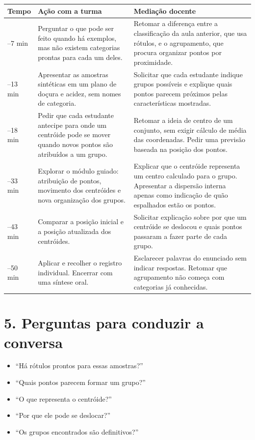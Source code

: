 \documentclass[12pt,a4paper]{article}
\begin{document}
\renewcommand{\arraystretch}{1.22}
\begin{tabularx}{\linewidth}{|>{\centering\arraybackslash}p{1.65cm}|p{5.0cm}|X|}
\hline
\textbf{Tempo} & \textbf{Ação com a turma} & \textbf{Mediação docente} \\
\hline
0--7 min & Perguntar o que pode ser feito quando há exemplos, mas não existem categorias prontas para cada um deles. & Retomar a diferença entre a classificação da aula anterior, que usa rótulos, e o agrupamento, que procura organizar pontos por proximidade. \\
\hline
7--13 min & Apresentar as amostras sintéticas em um plano de doçura e acidez, sem nomes de categoria. & Solicitar que cada estudante indique grupos possíveis e explique quais pontos parecem próximos pelas características mostradas. \\
\hline
13--18 min & Pedir que cada estudante antecipe para onde um centróide pode se mover quando novos pontos são atribuídos a um grupo. & Retomar a ideia de centro de um conjunto, sem exigir cálculo de média das coordenadas. Pedir uma previsão baseada na posição dos pontos. \\
\hline
18--33 min & Explorar o módulo guiado: atribuição de pontos, movimento dos centróides e nova organização dos grupos. & Explicar que o centróide representa um centro calculado para o grupo. Apresentar a dispersão interna apenas como indicação de quão espalhados estão os pontos. \\
\hline
33--43 min & Comparar a posição inicial e a posição atualizada dos centróides. & Solicitar explicação sobre por que um centróide se deslocou e quais pontos passaram a fazer parte de cada grupo. \\
\hline
43--50 min & Aplicar e recolher o registro individual. Encerrar com uma síntese oral. & Esclarecer palavras do enunciado sem indicar respostas. Retomar que agrupamento não começa com categorias já conhecidas. \\
\hline
\end{tabularx}

\section*{5. Perguntas para conduzir a conversa}

\begin{itemize}
  \item ``Há rótulos prontos para essas amostras?''
  \item ``Quais pontos parecem formar um grupo?''
  \item ``O que representa o centróide?''
  \item ``Por que ele pode se deslocar?''
  \item ``Os grupos encontrados são definitivos?''
\end{itemize}
\end{document}
